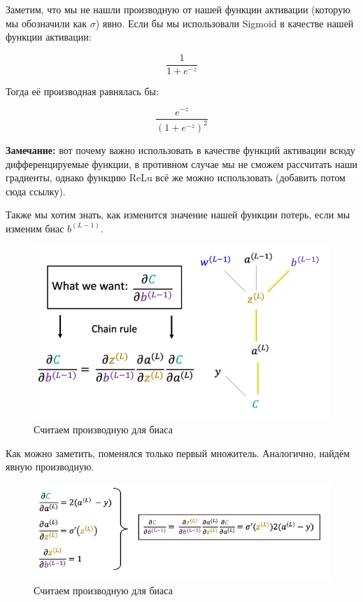 \documentclass[a4paper, 10pt, openany]{book} %
\begin{document}
	Заметим, что мы не нашли производную от нашей функции активации (которую мы обозначили как $\sigma$) явно. Если бы мы использовали Sigmoid в качестве нашей функции активации:
	
	\[\dfrac{1}{1+e^{-z}}\]
	
	Тогда её производная равнялась бы:
	
	\[\dfrac{e^{-z}}{(1+e^{-z})^2}\]
	
	\textbf{Замечание:} вот почему важно использовать в качестве функций активации всюду дифференцируемые функции, в противном случае мы не сможем рассчитать наши градиенты, однако функцию ReLu всё же можно использовать (добавить потом сюда ссылку).
	
	Также мы хотим знать, как изменится значение нашей функции потерь, если мы изменим биас $b^{(L-1)}$.
	
	\begin{figure}[h!]
		\centering
		\includegraphics[width=\linewidth]{pictures/backpropagation/bias.png}
		\caption{Считаем производную для биаса}
		\label{derivative_bias}
	\end{figure}
	
	Как можно заметить, поменялся только первый множитель. Аналогично, найдём явную производную.
	
	\begin{figure}[h!]
		\centering
		\includegraphics[width=\linewidth]{pictures/backpropagation/derivative_itself_bias.png}
		\caption{Считаем производную для биаса}
		\label{derivative_itself_bias}
	\end{figure}
	
\end{document}

